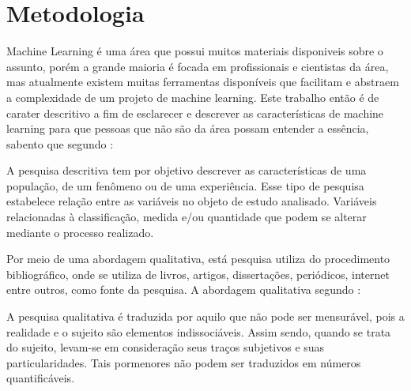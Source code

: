 \chapter{Metodologia}
\label{chap:metodologia}

Machine Learning é uma área que possui muitos materiais disponiveis sobre o assunto,
porém a grande maioria é focada em profissionais e cientistas da área, mas atualmente existem muitas ferramentas disponíveis
que facilitam e abstraem a complexidade de um projeto de machine learning. Este trabalho então é de carater descritivo a fim de esclarecer 
e descrever as características de machine learning para que pessoas que não são da área possam entender a essência,     
sabento que segundo \cite{descritiva}:

\begin{citacao} 
 A pesquisa descritiva tem por objetivo descrever as características de uma população, de um fenômeno ou de uma experiência. 
 Esse tipo de pesquisa estabelece relação entre as variáveis no objeto de estudo analisado. 
 Variáveis relacionadas à classificação, medida e/ou quantidade que podem se alterar mediante o processo realizado.  
\end{citacao} 


Por meio de uma abordagem qualitativa, está pesquisa utiliza do procedimento bibliográfico, onde se utiliza de livros, 
artigos, dissertações, periódicos, internet entre outros, como fonte da pesquisa. A abordagem qualitativa segundo \cite{qualitativa} :

\begin{citacao}
A pesquisa qualitativa é traduzida por aquilo que não pode ser mensurável, pois a realidade e o sujeito são elementos indissociáveis. 
Assim sendo, quando se trata do sujeito, levam-se em consideração seus traços subjetivos e suas particularidades. 
Tais pormenores não podem ser traduzidos em números quantificáveis.
\end{citacao}